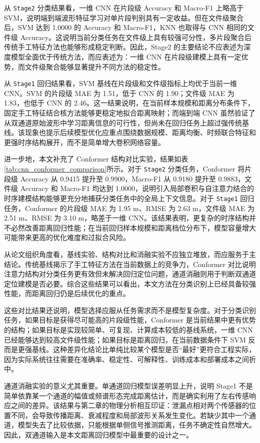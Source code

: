 从 \texttt{Stage2} 分类结果看，一维 CNN 在片段级 Accuracy 和 Macro-F1 上略高于 SVM，说明端到端波形特征学习对单片段判别具有一定收益。但在文件级聚合后，SVM 达到 1.0000 的 Accuracy 和 Macro-F1，KNN 也取得与 CNN 相同的文件级 Accuracy。这说明当前分类任务在文件级上具有较强可分性，多片段聚合后传统手工特征方法也能够形成稳定判断。因此，Stage2 的主要结论不应表述为深度模型全面优于传统方法，而应表述为：一维 CNN 在片段级建模上具有一定优势，而文件级聚合能够显著提升不同方法的稳定性。

从 \texttt{Stage1} 回归结果看，SVM 基线在片段级和文件级指标上均优于当前一维 CNN。SVM 的片段级 MAE 为 1.51，低于 CNN 的 1.90；文件级 MAE 为 1.83，也低于 CNN 的 2.46。这一结果说明，在当前样本规模和距离分布条件下，固定手工特征结合核方法能够更稳定地拟合距离映射；而端到端 CNN 虽然验证了从双通道原始波形中学习距离信息的可行性，但尚未在回归任务上超过强传统基线。该现象也提示后续模型优化应重点围绕数据规模、距离均衡、时频联合特征和更强时序结构展开，而不是简单增大卷积网络容量。

进一步地，本文补充了 Conformer 结构对比实验，结果如表\ref{tab:cnn_conformer_comparison}所示。对于 \texttt{Stage2} 分类任务，Conformer 将片段级 Accuracy 从 0.9415 提升至 0.9900，Macro-F1 从 0.9180 提升至 0.9883，文件级 Accuracy 和 Macro-F1 均达到 1.0000，说明引入局部卷积与自注意力结合的时序建模结构能够更充分地捕获分类任务中的全局上下文信息。对于 \texttt{Stage1} 回归任务，Conformer 的片段级 MAE 为 1.95 m、RMSE 为 2.63 m，文件级 MAE 为 2.51 m、RMSE 为 3.10 m，略差于一维 CNN。该结果表明，更复杂的时序结构并不必然改善距离回归性能；在当前回归样本规模和距离档位分布下，模型容量增大可能带来更高的优化难度和过拟合风险。

从论文组织角度看，基线实验、结构对比和消融实验不应独立堆放，而应服务于主结论。传统基线揭示了手工特征方法在当前数据上的竞争力，Conformer 对比说明注意力结构对分类任务更有效但未解决回归定位问题，通道消融则用于判断双通道定位建模是否必要。综合这些结果可以看出，本文方法在分类识别上已经具备较强性能，而距离回归仍是后续优化的重点。

这些对比结果还说明，模型选择应服从任务需求而不是模型复杂度。对于分类识别任务，如果目标是获得尽可能高的片段级性能，Conformer 是当前结果中更有优势的结构；如果目标是实现较简单、可复现、计算成本较低的基线系统，一维 CNN 已经能够达到较高文件级性能；如果目标是距离回归，在当前数据条件下 SVM 反而是更强基线。这种差异化结论比单纯比较某个模型是否“最好”更符合工程实际，因为实际系统往往需要在准确率、稳定性、可解释性、训练成本和部署成本之间折中。

通道消融实验的意义尤其重要。单通道回归模型误差明显上升，说明 Stage1 不是简单依靠某一个通道的幅值或频谱形态完成距离估计，而是确实利用了左右传感响应之间的差异。该结果与第二章的物理分析相互印证：泄漏点相对两个传感器的位置不同，会导致传播距离、衰减程度和局部波形关系发生变化。若缺少其中一个通道，模型失去了比较依据，只能根据单侧信号推测距离，任务不确定性自然增大。因此，双通道输入是本文距离回归模型中最重要的设计之一。

